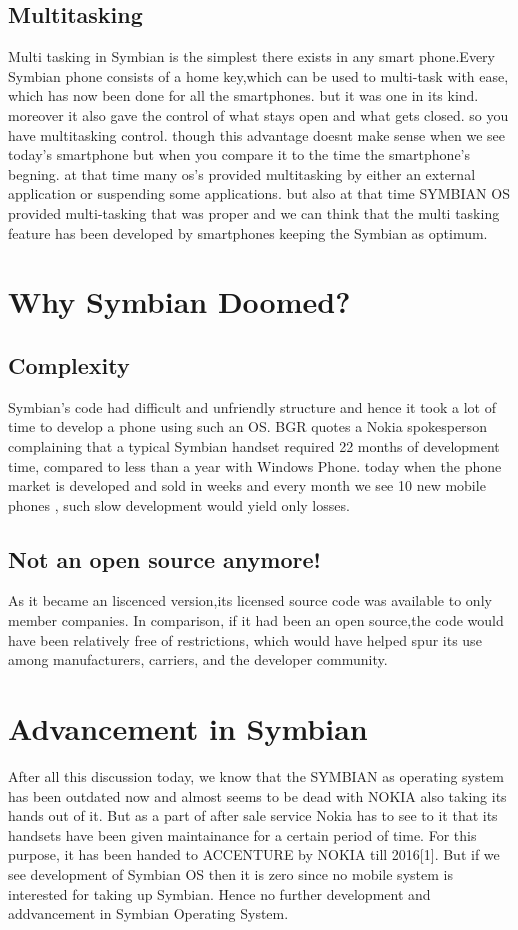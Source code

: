 \documentclass[a4paper,11pt]{article}
\begin{document}
\subsection{Multitasking}
Multi tasking in Symbian is the simplest there exists in any smart phone.Every Symbian phone consists of a home key,which can be used to multi-task with ease, which has now been done for all the smartphones. but it was one in its kind. moreover it also gave the control of what stays open and what gets closed. so you have multitasking control. 
though this advantage doesnt make sense when we see today's smartphone but when you compare it to the time the smartphone's begning. at that time many os's provided multitasking by either an external application or suspending some applications. but also at that time SYMBIAN OS provided  multi-tasking that was proper and we can think that the multi tasking feature has been developed by smartphones keeping the Symbian as optimum.

\section{Why Symbian Doomed?}
\subsection{Complexity}
Symbian's code had difficult and unfriendly structure and hence it took a lot of time to develop a phone using such an OS. BGR quotes a Nokia spokesperson complaining that a typical Symbian handset required 22 months of development time, compared to less than a year with Windows Phone. today when the phone market is developed and sold in weeks and every month we see  10 new mobile phones , such slow development would yield only losses.

\subsection{Not an open source anymore!}
As it became an liscenced version,its licensed source code was available to only member companies. In comparison, if it had been an open source,the code would have been relatively free of restrictions, which would have helped spur its use among manufacturers, carriers, and the developer community. 

\section{Advancement in Symbian}
After all this discussion today, we know that the SYMBIAN as operating system has been outdated now and almost seems to be dead with NOKIA also taking its hands out of it. But as a part of after sale service Nokia has to see to it that its handsets have been given maintainance for a certain period of time. For this purpose, it has been handed to ACCENTURE by NOKIA till 2016[1]. But if we see development of Symbian OS then it is zero since no mobile system is interested for taking up Symbian.
Hence no further development and addvancement in Symbian Operating System.
\end{document}
